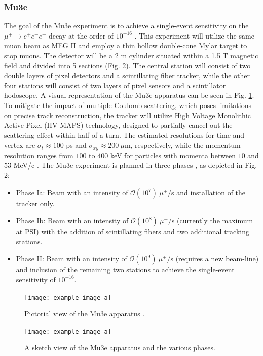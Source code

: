 \begin{refsection}
        \subsubsection{Mu3e}
        The goal of the Mu3e experiment is to achieve a single-event sensitivity on the $\mu^+ \rightarrow e^+ e^+e^-$ decay at the order of $10^{-16}$ \cite{Mu3e:2016}. This experiment will utilize the same muon beam as MEG II and employ a thin hollow double-cone Mylar target to stop muons. The detector will be a 2 m cylinder situated within a 1.5 T magnetic field and divided into 5 sections (Fig. \ref{_Mu3e}). The central station will consist of two double layers of pixel detectors and a scintillating fiber tracker, while the other four stations will consist of two layers of pixel sensors and a scintillator hodoscope. A visual representation of the Mu3e apparatus can be seen in Fig. \ref{_Mu3e_3D}. To mitigate the impact of multiple Coulomb scattering, which poses limitations on precise track reconstruction, the tracker will utilize High Voltage Monolithic Active Pixel (HV-MAPS) technology, designed to partially cancel out the scattering effect within half of a turn. The estimated resolutions for time and vertex are $\sigma_t \approx 100$ ps and $\sigma_{xy} \approx 200\ \mu$m, respectively, while the momentum resolution ranges from $100$ to $400$ keV for particles with momenta between $10$ and $53$ MeV/c \cite{Signorelli}. The Mu3e experiment is planned in three phases \cite{Signorelli}, as depicted in Fig. \ref{_Mu3e}:
\begin{itemize}
    \item Phase Ia: Beam with an intensity of $\mathcal{O}(10^7)\ \mu^+/$s and installation of the tracker only.
    \item Phase Ib: Beam with an intensity of $\mathcal{O}(10^8)\ \mu^+/$s (currently the maximum at PSI) with the addition of scintillating fibers and two additional tracking stations.
    \item Phase II: Beam with an intensity of $\mathcal{O}(10^9)\ \mu^+/$s (requires a new beam-line) and inclusion of the remaining two stations to achieve the single-event sensitivity of $10^{-16}$.
\end{itemize}

\begin{figure}[h!]
\centering
\texttt{[image: example-image-a]}
\caption[Mu3e experiment]{Pictorial view of the Mu3e apparatus \cite{Papa}.}
\label{_Mu3e_3D}
\end{figure}

\begin{figure}[h!]
\centering
\texttt{[image: example-image-a]}
\caption[Mu3e experiment phases]{A sketch view of the Mu3e apparatus \cite{Mu3e:2013} and the various phases.}
\label{_Mu3e}
\end{figure}



\end{refsection}
